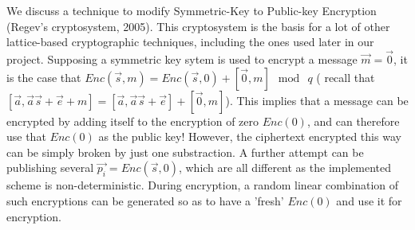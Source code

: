 We discuss a technique to modify Symmetric-Key to Public-key
Encryption (Regev's cryptosystem, 2005). This cryptosystem is the basis for a
lot of other lattice-based cryptographic techniques, including the ones used
later in our project. Supposing a symmetric key sytem is used to
encrypt a message $\vec{m} = \vec{0}$, it is the case that
$Enc(\vec{s}, m) = Enc(\vec{s},0) + [\vec{0}, m] \mod \ q$ ( recall that
$[\vec{a}, \vec{a}\vec{s} + \vec{e} + m] = [\vec{a}, \vec{a}\vec{s} + \vec{e}] +
[\vec{0}, m]$). This implies that a message can be encrypted by adding itself to
the encryption of zero $Enc(0)$, and can therefore use that $Enc(0)$ as the
public key! However, the ciphertext encrypted this way can be simply broken by
just one substraction. A further attempt can be publishing several
$\vec{p_i} = Enc(\vec{s}, 0)$, which are all different as the implemented scheme is
non-deterministic. During encryption, a random linear
combination of such encryptions can be generated so as to have a 'fresh' $Enc(0)$ and use it for
encryption.
